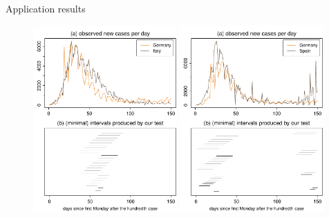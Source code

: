 \documentclass[10pt]{beamer}
\begin{document}
\begin{frame}{Application results}
	\begin{figure}
		\includegraphics[width=0.49\textwidth]{plots/DEU_vs_ITA_presentation}
		\hfill
		\includegraphics[width=0.49\textwidth]{plots/DEU_vs_ESP_presentation}
	\end{figure}
\end{frame}
\end{document}
